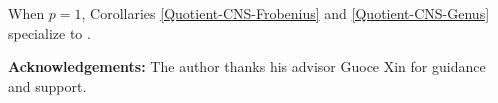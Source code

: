 \documentclass[reqno, 12pt]{article}
\theoremstyle{mydefinition}
\theoremstyle{myremark}
\numberwithin{algorithm}{section}
\begin{document}
When $p=1$, Corollaries \ref{Quotient-CNS-Frobenius} and \ref{Quotient-CNS-Genus} specialize to \cite[Corollaries 2.16 and 2.17]{LiuSemigroupF}.














\noindent
{\small \textbf{Acknowledgements:}}
The author thanks his advisor Guoce Xin for guidance and support.
\end{document}
